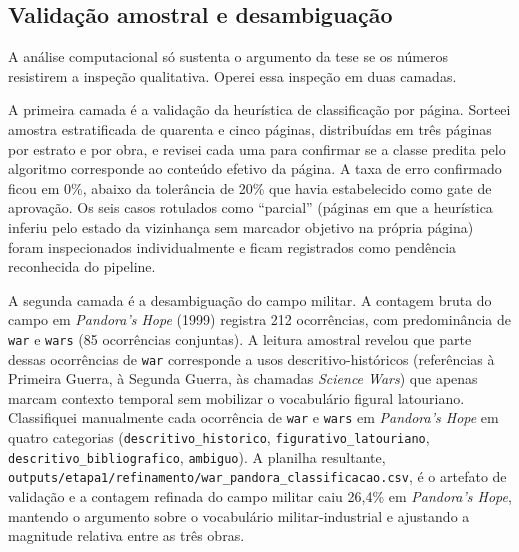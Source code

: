 \subsection{Validação amostral e desambiguação}

A análise computacional só sustenta o argumento da tese se os números resistirem a inspeção qualitativa. Operei essa inspeção em duas camadas.

A primeira camada é a validação da heurística de classificação por página. Sorteei amostra estratificada de quarenta e cinco páginas, distribuídas em três páginas por estrato e por obra, e revisei cada uma para confirmar se a classe predita pelo algoritmo corresponde ao conteúdo efetivo da página. A taxa de erro confirmado ficou em 0\%, abaixo da tolerância de 20\% que havia estabelecido como gate de aprovação. Os seis casos rotulados como \enquote{parcial} (páginas em que a heurística inferiu pelo estado da vizinhança sem marcador objetivo na própria página) foram inspecionados individualmente e ficam registrados como pendência reconhecida do pipeline.

A segunda camada é a desambiguação do campo militar. A contagem bruta do campo em \emph{Pandora's Hope} (1999) registra 212 ocorrências, com predominância de \texttt{war} e \texttt{wars} (85 ocorrências conjuntas). A leitura amostral revelou que parte dessas ocorrências de \texttt{war} corresponde a usos descritivo-históricos (referências à Primeira Guerra, à Segunda Guerra, às chamadas \emph{Science Wars}) que apenas marcam contexto temporal sem mobilizar o vocabulário figural latouriano. Classifiquei manualmente cada ocorrência de \texttt{war} e \texttt{wars} em \emph{Pandora's Hope} em quatro categorias (\texttt{descritivo\_historico}, \texttt{figurativo\_latouriano}, \texttt{descritivo\_bibliografico}, \texttt{ambiguo}). A planilha resultante, \texttt{outputs/etapa1/refinamento/war\_pandora\_classificacao.csv}, é o artefato de validação e a contagem refinada do campo militar caiu 26,4\% em \emph{Pandora's Hope}, mantendo o argumento sobre o vocabulário militar-industrial e ajustando a magnitude relativa entre as três obras.

